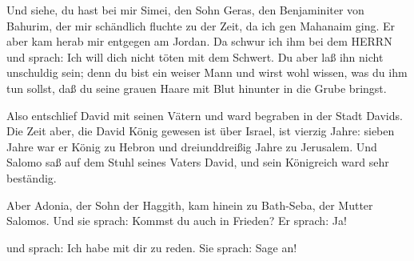  Und siehe, du hast bei mir Simei, den Sohn Geras, den
Benjaminiter von Bahurim, der mir schändlich fluchte zu der Zeit, da ich
gen Mahanaim ging. Er aber kam herab mir entgegen am Jordan. Da schwur
ich ihm bei dem HERRN und sprach: Ich will dich nicht töten mit dem
Schwert.  Du aber laß ihn nicht unschuldig sein; denn du
bist ein weiser Mann und wirst wohl wissen, was du ihm tun sollst, daß
du seine grauen Haare mit Blut hinunter in die Grube bringst.

 Also entschlief David mit seinen Vätern und ward begraben
in der Stadt Davids.  Die Zeit aber, die David König
gewesen ist über Israel, ist vierzig Jahre: sieben Jahre war er König zu
Hebron und dreiunddreißig Jahre zu Jerusalem.  Und Salomo
saß auf dem Stuhl seines Vaters David, und sein Königreich ward sehr
beständig.

 Aber Adonia, der Sohn der Haggith, kam hinein zu
Bath-Seba, der Mutter Salomos. Und sie sprach: Kommst du auch in
Frieden? Er sprach: Ja!

 und sprach: Ich habe mit dir zu reden. Sie sprach: Sage
an!

